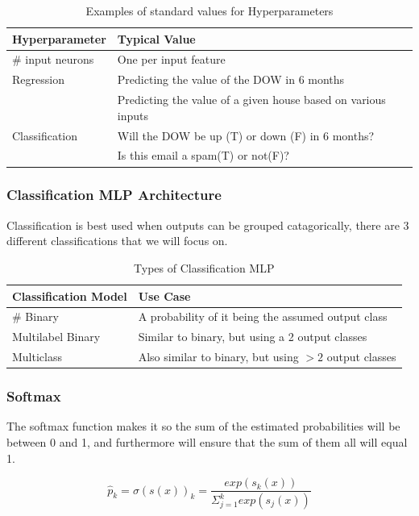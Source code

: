 \documentclass[article]{llncs}
\begin{document}
\begin{table}[!htbp]
\caption{Examples of standard values for Hyperparameters}\label{tab1}
\begin{tabular}{|l|l|}
\hline
Hyperparameter &  Typical Value \\
\hline
$\#$ input neurons &  One per input feature\\
\hline
Regression &  {Predicting the value of the DOW in 6 months} \\
           & {Predicting the value of a given house based on various inputs}\\
\hline
Classification & {Will the DOW be up (T) or down (F) in 6 months?}\\
               & {Is this email a spam(T) or not(F)?} \\
\hline
\end{tabular}
\end{table}

\subsubsection{Classification MLP Architecture}
Classification is best used when outputs can be grouped catagorically, there are 3 different classifications that we will focus on.

\begin{table}[H]
\caption{Types of Classification MLP}\label{tab1}
\begin{tabular}{|l|l|}
\hline
Classification Model &  Use Case \\
\hline
$\#$ Binary &  A probability of it being the assumed output class\\
\hline
Multilabel Binary &  {Similar to binary, but using a 2 output classes} \\
\hline
Multiclass & {Also similar to binary, but using $>2$ output classes}\\
\hline
\end{tabular}
\end{table}
\subsubsection{Softmax}

The softmax function makes it so the sum of the estimated probabilities will be between 0 and 1, and furthermore will ensure that the sum of them all will equal 1.

$$
\hat{p}_k = \sigma(s(x))_k = \frac{exp(s_k(x))}{\Sigma_{j=1}^k exp(s_j(x))}
$$
\end{document}
